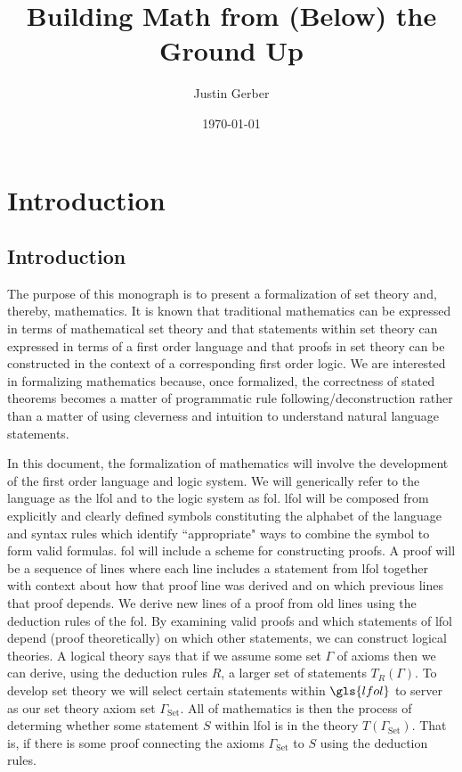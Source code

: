 \documentclass[oneside, 12pt]{book}
\title{Building Math from (Below) the Ground Up}
\author{Justin Gerber}
\date{\today}
\theoremstyle{break}
\newtheorem{preformal definition}[definition]{Preformal Definition}
\newtheorem{preformal theorem}[theorem]{Preformal Theorem}
\newcommand{\qq}[1]{``#1"}
\begin{document}
	
	\maketitle
	

	\chapter{Introduction}
	\label{ch:intro}
	
		\section{Introduction}
			The purpose of this monograph is to present a formalization of set theory and, thereby, mathematics.
			It is known that traditional mathematics can be expressed in terms of mathematical set theory and that statements within set theory can expressed in terms of a first order language and that proofs in set theory can be constructed in the context of a corresponding first order logic.
			We are interested in formalizing mathematics because, once formalized, the correctness of stated theorems becomes a matter of programmatic rule following/deconstruction rather than a matter of using cleverness and intuition to understand natural language statements.
			
			In this document, the formalization of mathematics will involve the development of the first order language and logic system.			
			We will generically refer to the language as the \gls{lfol} and to the logic system as \gls{fol}.
			\gls{lfol} will be composed from explicitly and clearly defined symbols constituting the alphabet of the language and syntax rules which identify \qq{appropriate} ways to combine the symbol to form valid formulas.
			\gls{fol} will include a scheme for constructing proofs.
			A proof will be a sequence of lines where each line includes a statement from \gls{lfol} together with context about how that proof line was derived and on which previous lines that proof depends.
			We derive new lines of a proof from old lines using the deduction rules of the \gls{fol}.
			By examining valid proofs and which statements of \gls{lfol} depend (proof theoretically) on which other statements, we can construct logical theories.
			A logical theory says that if we assume some set $\Gamma$ of axioms then we can derive, using the deduction rules $R$, a larger set of statements $T_R(\Gamma)$.
			To develop set theory we will select certain statements within $\gls{lfol}$ to server as our set theory axiom set $\Gamma_{\text{Set}}$.
			All of mathematics is then the process of determing whether some statement $S$ within \gls{lfol} is in the theory $T(\Gamma_{\text{Set}})$.
			That is, if there is some proof connecting the axioms $\Gamma_{\text{Set}}$ to $S$ using the deduction rules.
			
\end{document}

